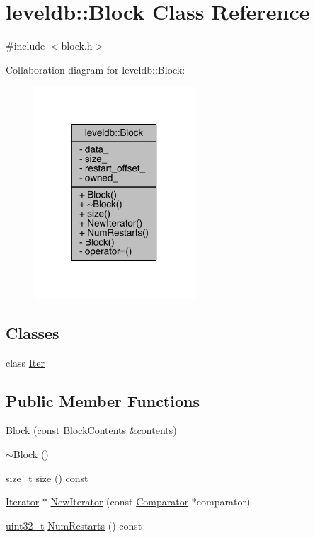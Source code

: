 \hypertarget{classleveldb_1_1_block}{}\section{leveldb\+:\+:Block Class Reference}
\label{classleveldb_1_1_block}


{\ttfamily \#include $<$block.\+h$>$}



Collaboration diagram for leveldb\+:\+:Block\+:\nopagebreak
\begin{figure}[H]
\begin{center}
\leavevmode
\includegraphics[width=170pt]{classleveldb_1_1_block__coll__graph}
\end{center}
\end{figure}
\subsection*{Classes}
\begin{DoxyCompactItemize}
\item 
class \hyperlink{classleveldb_1_1_block_1_1_iter}{Iter}
\end{DoxyCompactItemize}
\subsection*{Public Member Functions}
\begin{DoxyCompactItemize}
\item 
\hyperlink{classleveldb_1_1_block_a242f2101a3c906b6f75f5c008e3ecdd9}{Block} (const \hyperlink{structleveldb_1_1_block_contents}{Block\+Contents} \&contents)
\item 
\hyperlink{classleveldb_1_1_block_a949c8f02dd434861cc1c352bd258ea47}{$\sim$\+Block} ()
\item 
size\+\_\+t \hyperlink{classleveldb_1_1_block_aa3834a89827b5363c11fbdca6d0b1c92}{size} () const 
\item 
\hyperlink{classleveldb_1_1_iterator}{Iterator} $\ast$ \hyperlink{classleveldb_1_1_block_a336289029f37d18d31a1a3c178afc7b3}{New\+Iterator} (const \hyperlink{structleveldb_1_1_comparator}{Comparator} $\ast$comparator)
\item 
\hyperlink{stdint_8h_a435d1572bf3f880d55459d9805097f62}{uint32\+\_\+t} \hyperlink{classleveldb_1_1_block_a50f716365aa5b729943a1c3eb2d06e9d}{Num\+Restarts} () const 
\end{DoxyCompactItemize}
